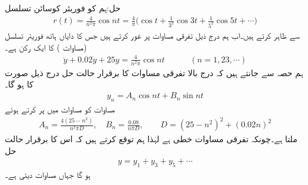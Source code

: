 حل:ہم  کو فوریئر کوسائن تسلسل
\begin{align}\label{مساوات_فوریئر_جبری_ارتعاش_مثال_ب}
r(t)=\frac{4}{n^2\pi}\cos nt=\frac{4}{\pi} \big(\cos t+\frac{1}{3^2}\cos 3t+\frac{1}{5^2}\cos 5t+\cdots\big)
\end{align}
سے ظاہر کرتے ہیں۔اب ہم درج ذیل تفرقی مساوات پر غور کرتے ہیں جس کا دایاں ہاتھ فوریئر تسلسل (مساوات ) کا ایک رکن ہے۔
\begin{align}\label{مساوات_فوریئر_جبری_ارتعاش_مثال_پ}
\ddot{y}+0.02\dot{y}+25y=\frac{4}{n^2\pi}\cos nt\quad \quad \quad (n=1,23,\cdots)
\end{align}
ہم حصہ  سے جانتے ہیں کہ درج بالا تفرقی مساوات کا برقرار حالت حل درج ذیل صورت کا ہو گا۔
\begin{align}\label{مساوات_فوریئر_جبری_ارتعاش_مثال_ت}
y_n=A_n\cos nt+B_n\sin nt
\end{align}
مساوات  کو مساوات  میں پر کرتے ہوئے
\begin{align}\label{مساوات_فوریئر_جبری_ارتعاش_مثال_ٹ}
A_n=\frac{4(25-n^2)}{n^2\pi D}, \quad B_n=\frac{0.08}{n\pi D}, \quad  \quad D=(25-n^2)^2+(0.02n)^2
\end{align}
ملتا ہے۔چونکہ تفرقی مساوات  خطی ہے لہٰذا ہم توقع کرتے ہیں کہ اس کا برقرار حالت حل 
\begin{align}\label{مساوات_فوریئر_جبری_ارتعاش_مثال_ث}
y=y_1+y_3+y_5+\cdots
\end{align}
ہو گا جہاں مساوات   دیتی ہے۔

